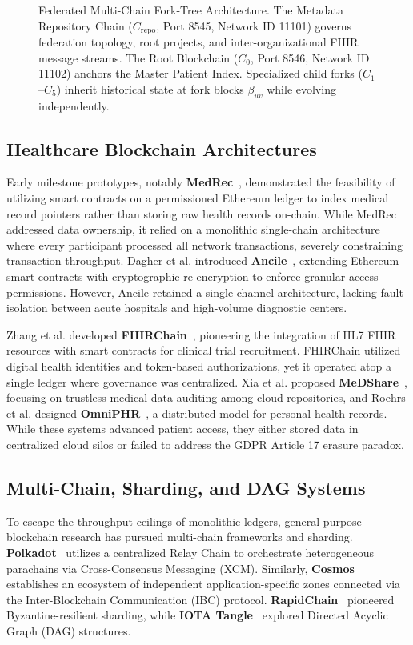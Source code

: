 \documentclass[journal]{IEEEtran}
\theoremstyle{definition}
\begin{document}
\begin{figure}[t]
\centering

\caption{Federated Multi-Chain Fork-Tree Architecture. The Metadata Repository Chain ($C_{\text{repo}}$, Port 8545, Network ID 11101) governs federation topology, root projects, and inter-organizational FHIR message streams. The Root Blockchain ($C_0$, Port 8546, Network ID 11102) anchors the Master Patient Index. Specialized child forks ($C_1$--$C_5$) inherit historical state at fork blocks $\beta_{uv}$ while evolving independently.}
\label{fig:topology}
\end{figure}

\subsection{Healthcare Blockchain Architectures}
Early milestone prototypes, notably \textbf{MedRec}~\cite{ekblaw2016medrec}, demonstrated the feasibility of utilizing smart contracts on a permissioned Ethereum ledger to index medical record pointers rather than storing raw health records on-chain. While MedRec addressed data ownership, it relied on a monolithic single-chain architecture where every participant processed all network transactions, severely constraining transaction throughput. Dagher et al. introduced \textbf{Ancile}~\cite{dagher2018ancile}, extending Ethereum smart contracts with cryptographic re-encryption to enforce granular access permissions. However, Ancile retained a single-channel architecture, lacking fault isolation between acute hospitals and high-volume diagnostic centers.

Zhang et al. developed \textbf{FHIRChain}~\cite{zhang2018fhirchain}, pioneering the integration of HL7 FHIR resources with smart contracts for clinical trial recruitment. FHIRChain utilized digital health identities and token-based authorizations, yet it operated atop a single ledger where governance was centralized. Xia et al. proposed \textbf{MeDShare}~\cite{xia2017medshare}, focusing on trustless medical data auditing among cloud repositories, and Roehrs et al. designed \textbf{OmniPHR}~\cite{roehrs2017omniphr}, a distributed model for personal health records. While these systems advanced patient access, they either stored data in centralized cloud silos or failed to address the GDPR Article 17 erasure paradox.

\subsection{Multi-Chain, Sharding, and DAG Systems}
To escape the throughput ceilings of monolithic ledgers, general-purpose blockchain research has pursued multi-chain frameworks and sharding. \textbf{Polkadot}~\cite{wood2016polkadot} utilizes a centralized Relay Chain to orchestrate heterogeneous parachains via Cross-Consensus Messaging (XCM). Similarly, \textbf{Cosmos}~\cite{kwon2019cosmos} establishes an ecosystem of independent application-specific zones connected via the Inter-Blockchain Communication (IBC) protocol. \textbf{RapidChain}~\cite{zamani2018rapidchain} pioneered Byzantine-resilient sharding, while \textbf{IOTA Tangle}~\cite{popov2018tangle} explored Directed Acyclic Graph (DAG) structures. 
\end{document}
